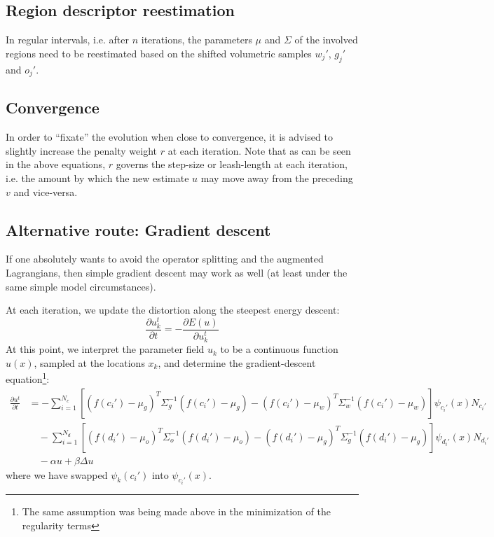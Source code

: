 \documentclass[a4paper,12pt]{article}
\begin{document}
\subsection{Region descriptor reestimation}
In regular intervals, i.e. after $n$ iterations, the parameters $\mu$ and $\Sigma$ of the involved regions need to be reestimated based on the shifted volumetric samples $w_j'$, $g_j'$ and $o_j'$.

\subsection{Convergence}
In order to ``fixate'' the evolution when close to convergence, it is advised to slightly increase the penalty weight $r$ at each iteration. Note that as can be seen in the above equations, $r$ governs the step-size or  leash-length at each iteration, i.e. the amount by which the new estimate $u$ may move away from the preceding $v$ and vice-versa. 


\subsection{Alternative route: Gradient descent}
If one absolutely wants to avoid the operator splitting and the augmented Lagrangians, then simple gradient descent may work as well (at least under the same simple model circumstances).

At each iteration, we update the distortion along the steepest energy descent:
\begin{equation}
\frac{\partial u_k^t}{\partial t} = -\frac{\partial E(u)}{\partial u_k^t}
\end{equation}
At this point, we interpret the parameter field $u_k$ to be a continuous function $u(x)$, sampled at the locations $x_k$, and determine the gradient-descent equation\footnote{The same assumption was being made above in the minimization of the regularity terms}:
\begin{align}
\frac{\partial u^t}{\partial t} &= - \sum_{i=1}^{N_c} \left[(f(c_i')-\mu_g)^T\Sigma_g^{-1}(f(c_i')-\mu_g) - (f(c_i')-\mu_w)^T\Sigma_w^{-1}(f(c_i')-\mu_w)\right]\psi_{c_i'}(x)N_{c_i'}\nonumber\\
&\quad -\sum_{i=1}^{N_d} \left[(f(d_i')-\mu_o)^T\Sigma_o^{-1}(f(d_i')-\mu_o) - (f(d_i')-\mu_g)^T\Sigma_g^{-1}(f(d_i')-\mu_g)\right]\psi_{d_i'}(x)N_{d_i'}\\
&\quad -\alpha u + \beta\Delta u\nonumber
\end{align}
where we have swapped $\psi_k(c_i')$ into $\psi_{c_i'}(x)$.
\end{document}
